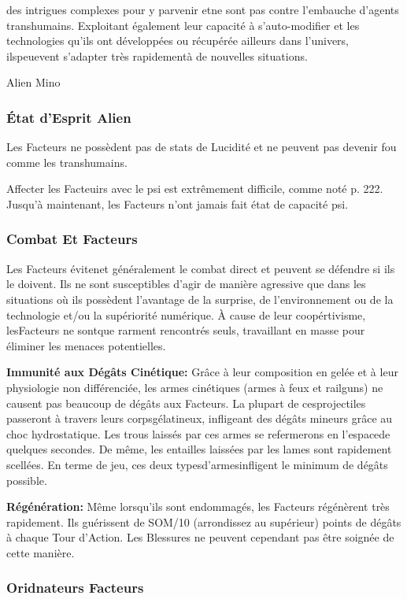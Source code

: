 des intrigues complexes pour y parvenir etne sont pas contre l'embauche d'agents transhumains. Exploitant également leur capacité à s'auto-modifier et les technologies qu'ils ont développées ou récupérée ailleurs dans l'univers, ilspeuevent s'adapter très rapidementà de nouvelles situations.

{Alien Mino}

\subsubsection{État d'Esprit Alien} 

Les Facteurs ne possèdent pas de stats de Lucidité et ne peuvent pas devenir fou comme les transhumains. 

Affecter les Facteuirs avec le psi est extrêmement difficile, comme noté p. 222. Jusqu'à maintenant, les Facteurs n'ont jamais fait état de capacité psi. 

\subsubsection{Combat Et Facteurs} 

Les Facteurs évitenet généralement le combat direct et peuvent se défendre si ils le doivent. Ils ne sont susceptibles d'agir de manière agressive que dans les situations où ils possèdent l'avantage de la surprise, de l'environnement ou de la technologie et/ou la supériorité numérique. À cause de leur coopértivisme, lesFacteurs ne sontque rarment rencontrés seuls, travaillant en masse pour éliminer les menaces potentielles. 

\textbf{Immunité aux Dégâts Cinétique: }Grâce à leur composition en gelée et à leur physiologie non différenciée, les armes cinétiques (armes à feux et railguns) ne causent pas beaucoup de dégâts aux Facteurs. La plupart de cesprojectiles passeront à travers leurs corpsgélatineux, infligeant des dégâts mineurs grâce au choc hydrostatique. Les trous laissés par ces armes se refermerons en l'espacede quelques secondes. De même, les entailles laissées par les lames sont rapidement scellées. En terme de jeu, ces deux typesd'armesinfligent le minimum de dégâts possible. 

\textbf{Régénération: }Même lorsqu'ils sont endommagés, les Facteurs régénèrent très rapidement. Ils guérissent de SOM/10 (arrondissez au supérieur) points de dégâts à chaque Tour d'Action. Les Blessures ne peuvent cependant pas être soignée de cette manière. 

\subsubsection{Oridnateurs Facteurs} 

